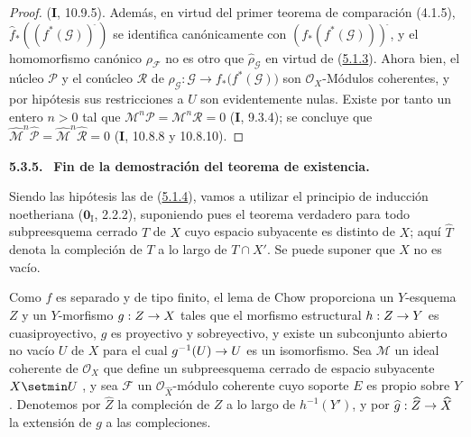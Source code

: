 \documentclass[10pt,oneside,openany]{book}
\theoremstyle{egaenv}\newtheorem*{env}{---}
\theoremstyle{egastatement}
\theoremstyle{egadescription}
\renewcommand{\to}{\mathchoice{\longrightarrow}{\rightarrow}{\rightarrow}{\rightarrow}}
\begin{document}
\begin{proof}
(\textbf{I}, 10.9.5). Además, en virtud del primer teorema de comparación (4.1.5),
$\widehat f_*((f^*(\mathcal G))^{\widehat{\,}})$ se identifica canónicamente con
$(f_*(f^*(\mathcal G)))^{\widehat{\,}}$,
y el homomorfismo canónico $\rho_{\mathcal F}$ no es otro que
$\widehat{\rho}_{\mathcal G}$ en virtud de
(\hyperref[III.5.1.3-fr]{5.1.3}). Ahora bien, el núcleo $\mathcal P$ y el conúcleo
$\mathcal R$ de
$\rho_{\mathcal G}:\mathcal G\longrightarrow f_*\bigl(f^*(\mathcal G)\bigr)$
son $\mathcal O_X$-Módulos coherentes, y por hipótesis sus restricciones a
$U$ son evidentemente nulas. Existe por tanto un entero $n>0$ tal que
$\mathcal M^n\mathcal P=\mathcal M^n\mathcal R=0$ (\textbf{I}, 9.3.4); se concluye que
$\widehat{\mathcal M}^{n}\widehat{\mathcal P}=
\widehat{\mathcal M}^{n}\widehat{\mathcal R}=0$
(\textbf{I}, 10.8.8 y 10.8.10).
\end{proof}

\par\medskip\noindent\textbf{5.3.5.}\ \label{III.5.3.5-fr}
\textbf{Fin de la demostración del teorema de existencia.}

Siendo las hipótesis las de (\hyperref[III.5.1.4-fr]{5.1.4}), vamos a
utilizar el principio de inducción noetheriana ($\mathbf{0}_{\mathrm I}$, 2.2.2), suponiendo
pues el teorema verdadero para todo subpreesquema cerrado $T$ de $X$ cuyo espacio subyacente es distinto
de $X$; aquí $\widehat T$ denota la compleción de $T$ a lo largo de
$T\cap X'$. Se puede suponer que $X$ no es vacío.

Como $f$ es separado y de tipo finito, el lema de Chow
 proporciona un $Y$-esquema $Z$ y un $Y$-morfismo
$g:Z\to X$ tales que el morfismo estructural $h:Z\to Y$ es
cuasiproyectivo, $g$ es proyectivo y sobreyectivo, y existe un
subconjunto abierto no vacío $U$ de $X$ para el cual
$g^{-1}(U)\to U$ es un isomorfismo. Sea $\mathcal M$ un ideal coherente
de $\mathcal O_X$ que define un subpreesquema cerrado de espacio subyacente
$X\setmin U$ , y sea $\mathcal F$ un
$\mathcal O_{\widehat X}$-módulo coherente cuyo soporte $E$ es propio sobre $Y$.
Denotemos por $\widehat Z$ la compleción de $Z$ a lo largo de
$h^{-1}(Y')$, y por
$\widehat g:\widehat Z\to\widehat X$ la extensión de $g$ a
las compleciones.
\end{document}
